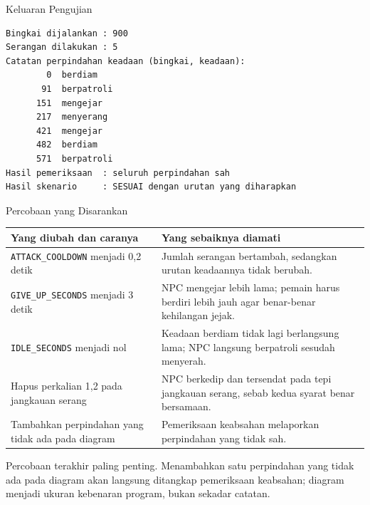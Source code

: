 \documentclass[aspectratio=169,10pt]{beamer}
\begin{document}
\begin{frame}[fragile]{Keluaran Pengujian}
\begin{lstlisting}[language={},numbers=none]
Bingkai dijalankan : 900
Serangan dilakukan : 5
Catatan perpindahan keadaan (bingkai, keadaan):
        0  berdiam
       91  berpatroli
      151  mengejar
      217  menyerang
      421  mengejar
      482  berdiam
      571  berpatroli
Hasil pemeriksaan  : seluruh perpindahan sah
Hasil skenario     : SESUAI dengan urutan yang diharapkan
\end{lstlisting}
\end{frame}

\begin{frame}{Percobaan yang Disarankan}
{\scriptsize
\renewcommand{\arraystretch}{1.12}
\begin{tabularx}{\textwidth}{@{}>{\raggedright\arraybackslash}p{6.0cm}
    >{\raggedright\arraybackslash}X@{}}
\toprule
\textbf{Yang diubah dan caranya} & \textbf{Yang sebaiknya diamati} \\
\midrule
\texttt{ATTACK\_COOLDOWN} menjadi 0,2 detik &
Jumlah serangan bertambah, sedangkan urutan keadaannya tidak berubah. \\
\addlinespace
\texttt{GIVE\_UP\_SECONDS} menjadi 3 detik &
NPC mengejar lebih lama; pemain harus berdiri lebih jauh agar benar-benar
kehilangan jejak. \\
\addlinespace
\texttt{IDLE\_SECONDS} menjadi nol &
Keadaan berdiam tidak lagi berlangsung lama; NPC langsung berpatroli sesudah
menyerah. \\
\addlinespace
Hapus perkalian 1,2 pada jangkauan serang &
NPC berkedip dan tersendat pada tepi jangkauan serang, sebab kedua syarat benar
bersamaan. \\
\addlinespace
Tambahkan perpindahan yang tidak ada pada diagram &
Pemeriksaan keabsahan melaporkan perpindahan yang tidak sah. \\
\bottomrule
\end{tabularx}}
\vspace{0.10cm}
\begin{kotak}
Percobaan terakhir paling penting. Menambahkan satu perpindahan yang tidak ada
pada diagram akan langsung ditangkap pemeriksaan keabsahan; diagram menjadi
ukuran kebenaran program, bukan sekadar catatan.
\end{kotak}
\end{frame}
\end{document}
